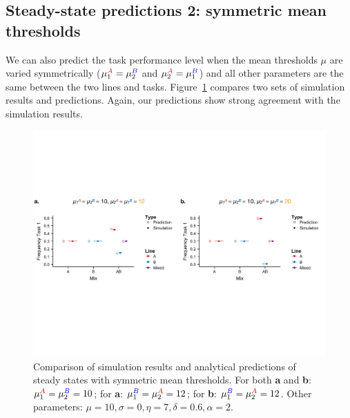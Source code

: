 \documentclass[11pt]{article}
\newcommand{\A}{{\color{red}A}}
\newcommand{\B}{{\color{blue}B}}
\newcommand{\later}{{\color{red}(Add later)}}
\begin{document}
\subsection{Steady-state predictions 2: symmetric mean thresholds} \label{sec:sspred2}
We can also predict the task performance level when the mean thresholds $\mu$ are varied symmetrically ($\mu_{1}^{\A} = \mu_{2}^{\B}$ and $\mu_{2}^{\A} = \mu_{1}^{\B}$) and all other parameters are the same between the two lines and tasks. Figure~\ref{fig:5050_comp_mu} compares two sets of simulation results and predictions. Again, our predictions show strong agreement with the simulation results.
\begin{figure}[H]
    \centering
    \includegraphics[trim={0 2.6in 0 2.5in}, clip, width=1\linewidth]{doc/model_comparison_mu.pdf}
    \caption{Comparison of simulation results and analytical predictions of steady states
    with symmetric mean thresholds. For both \textbf{a} and \textbf{b}: $\mu_1^{\A} = \mu_2^{\B} = 10$; for \textbf{a}: $\mu_1^{\B} = \mu_2^{\A} = 12$; for \textbf{b}: $\mu_1^{\B} = \mu_2^{\A} = 12$. Other parameters: $\mu = 10, \sigma = 0, \eta = 7, \delta = 0.6, \alpha = 2$. }
    \label{fig:5050_comp_mu}
\end{figure}


\end{document}
